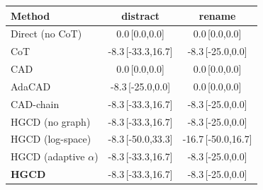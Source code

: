 \begin{tabular}{lcc}
\toprule
Method & distract & rename \\
\midrule
Direct (no CoT) & 0.0\,{\scriptsize[0.0,0.0]} & 0.0\,{\scriptsize[0.0,0.0]} \\
CoT & -8.3\,{\scriptsize[-33.3,16.7]} & -8.3\,{\scriptsize[-25.0,0.0]} \\
CAD & 0.0\,{\scriptsize[0.0,0.0]} & 0.0\,{\scriptsize[0.0,0.0]} \\
AdaCAD & -8.3\,{\scriptsize[-25.0,0.0]} & 0.0\,{\scriptsize[0.0,0.0]} \\
CAD-chain & -8.3\,{\scriptsize[-33.3,16.7]} & -8.3\,{\scriptsize[-25.0,0.0]} \\
HGCD (no graph) & -8.3\,{\scriptsize[-33.3,16.7]} & -8.3\,{\scriptsize[-25.0,0.0]} \\
HGCD (log-space) & -8.3\,{\scriptsize[-50.0,33.3]} & -16.7\,{\scriptsize[-50.0,16.7]} \\
HGCD (adaptive $\alpha$) & -8.3\,{\scriptsize[-33.3,16.7]} & -8.3\,{\scriptsize[-25.0,0.0]} \\
\textbf{HGCD} & -8.3\,{\scriptsize[-33.3,16.7]} & -8.3\,{\scriptsize[-25.0,0.0]} \\
\bottomrule
\end{tabular}
